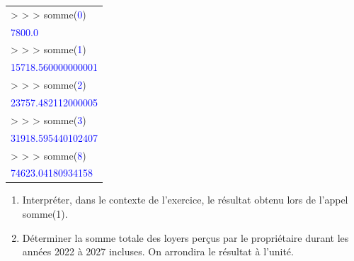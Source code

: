 \documentclass[10pt]{article}
\begin{document}
\begin{enumerate}
\begin{center}
\begin{tabular}[]{|l}
>\! >\! > somme(\textcolor{blue}{0})\\
\textcolor{blue}{7800.0}\\
>\! >\! > somme(\textcolor{blue}{1})\\
\textcolor{blue}{15718.560000000001}\\
>\! >\! > somme(\textcolor{blue}{2})\\
\textcolor{blue}{23757.482112000005}\\
>\! >\! > somme(\textcolor{blue}{3})\\
\textcolor{blue}{31918.595440102407}\\
>\! >\! > somme(\textcolor{blue}{8})\\
\textcolor{blue}{74623.04180934158}\\
\end{tabular}
\end{center}
	\begin{enumerate}
		\item Interpréter, dans le contexte de l'exercice, le résultat obtenu lors de l'appel somme(1).
		\item Déterminer la somme totale des loyers perçus par le propriétaire durant les années
2022 à 2027 incluses. On arrondira le résultat à l'unité.
	\end{enumerate}
\end{enumerate}
\end{document}
